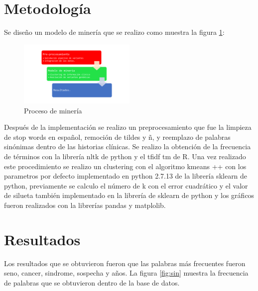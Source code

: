 \section{Metodología}

Se diseño un modelo de minería que se realizo como muestra la figura \ref{fig:mineria}:

\begin{figure}[H]
	\centering
	\includegraphics[width=0.5\textwidth]{Kap4/pipelinemineria}
	\caption{Proceso de minería} \label{fig:mineria}
\end{figure} 

Después de la implementación se realizo un preprocesamiento que fue la limpieza de stop words en español, remoción de tildes y ñ, y reemplazo de palabras sinónimas dentro de las historias clínicas. Se realizo la obtención de la frecuencia de términos con la librería nltk de python y el tfidf tm de R. Una vez realizado este procedimiento se realizo un clustering con el algoritmo kmeans ++  con los parametros por defecto implementado en python 2.7.13 de la librería sklearn de python, previamente se calculo el número de k con el error cuadrático y el valor de silueta también implementado en la librería de sklearn de python y los gráficos fueron realizados con la librerías pandas y matplolib.
 
\section{Resultados}

Los resultados que se obtuvieron fueron que las palabras más frecuentes fueron seno, cancer, sindrome, sospecha y años. La figura \ref{fig:sin} muestra la frecuencia de palabras que se obtuvieron dentro de la base de datos.

